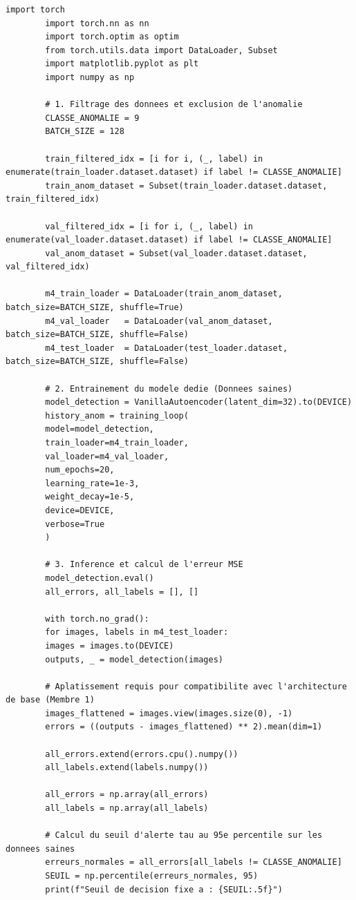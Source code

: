 \documentclass[11pt,a4paper]{report}
\begin{document}
	\begin{lstlisting}[caption=Pipeline complet de détection d'anomalies et de synthèse comparative]
		import torch
		import torch.nn as nn
		import torch.optim as optim
		from torch.utils.data import DataLoader, Subset
		import matplotlib.pyplot as plt
		import numpy as np
		
		# 1. Filtrage des donnees et exclusion de l'anomalie
		CLASSE_ANOMALIE = 9       
		BATCH_SIZE = 128
		
		train_filtered_idx = [i for i, (_, label) in enumerate(train_loader.dataset.dataset) if label != CLASSE_ANOMALIE]
		train_anom_dataset = Subset(train_loader.dataset.dataset, train_filtered_idx)
		
		val_filtered_idx = [i for i, (_, label) in enumerate(val_loader.dataset.dataset) if label != CLASSE_ANOMALIE]
		val_anom_dataset = Subset(val_loader.dataset.dataset, val_filtered_idx)
		
		m4_train_loader = DataLoader(train_anom_dataset, batch_size=BATCH_SIZE, shuffle=True)
		m4_val_loader   = DataLoader(val_anom_dataset,   batch_size=BATCH_SIZE, shuffle=False)
		m4_test_loader  = DataLoader(test_loader.dataset, batch_size=BATCH_SIZE, shuffle=False)
		
		# 2. Entrainement du modele dedie (Donnees saines)
		model_detection = VanillaAutoencoder(latent_dim=32).to(DEVICE)
		history_anom = training_loop(
		model=model_detection,
		train_loader=m4_train_loader,
		val_loader=m4_val_loader,
		num_epochs=20,
		learning_rate=1e-3,
		weight_decay=1e-5,
		device=DEVICE,
		verbose=True
		)
		
		# 3. Inference et calcul de l'erreur MSE
		model_detection.eval()
		all_errors, all_labels = [], []
		
		with torch.no_grad():
		for images, labels in m4_test_loader:
		images = images.to(DEVICE)
		outputs, _ = model_detection(images)
		
		# Aplatissement requis pour compatibilite avec l'architecture de base (Membre 1)
		images_flattened = images.view(images.size(0), -1)
		errors = ((outputs - images_flattened) ** 2).mean(dim=1)
		
		all_errors.extend(errors.cpu().numpy())
		all_labels.extend(labels.numpy())
		
		all_errors = np.array(all_errors)
		all_labels = np.array(all_labels)
		
		# Calcul du seuil d'alerte tau au 95e percentile sur les donnees saines
		erreurs_normales = all_errors[all_labels != CLASSE_ANOMALIE]
		SEUIL = np.percentile(erreurs_normales, 95)
		print(f"Seuil de decision fixe a : {SEUIL:.5f}")
		

\end{lstlisting}
\end{document}
